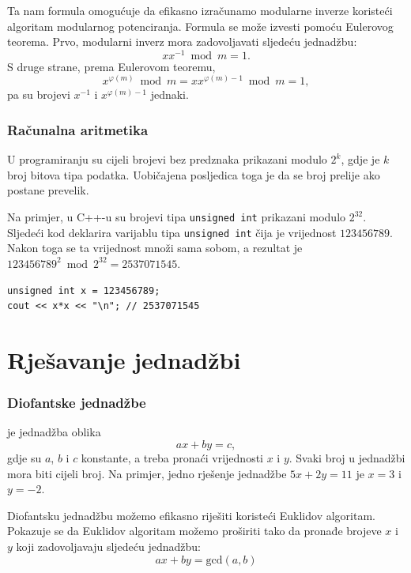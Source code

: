 Ta nam formula omogućuje da efikasno izračunamo
modularne inverze koristeći algoritam modularnog potenciranja.
Formula se može izvesti pomoću Eulerovog teorema.
Prvo, modularni inverz mora zadovoljavati sljedeću jednadžbu:
\[
x x^{-1} \bmod m = 1.
\]
S druge strane, prema Eulerovom teoremu,
\[
x^{\varphi(m)} \bmod m =  xx^{\varphi(m)-1} \bmod m = 1,
\]
pa su brojevi $x^{-1}$ i $x^{\varphi(m)-1}$ jednaki.

\subsubsection{Računalna aritmetika}

U programiranju su cijeli brojevi bez predznaka prikazani modulo $2^k$,
gdje je $k$ broj bitova tipa podatka.
Uobičajena posljedica toga je da se broj prelije
ako postane prevelik.

Na primjer, u C++-u su brojevi tipa \texttt{unsigned int}
prikazani modulo $2^{32}$.
Sljedeći kod deklarira varijablu tipa
\texttt{unsigned int} čija je vrijednost $123456789$.
Nakon toga se ta vrijednost množi sama sobom,
a rezultat je
$123456789^2 \bmod 2^{32} = 2537071545$.

\begin{lstlisting}
unsigned int x = 123456789;
cout << x*x << "\n"; // 2537071545
\end{lstlisting}

\section{Rješavanje jednadžbi}

\subsubsection*{Diofantske jednadžbe}


je jednadžba oblika
\[ ax + by = c, \]
gdje su $a$, $b$ i $c$ konstante,
a treba pronaći vrijednosti $x$ i $y$.
Svaki broj u jednadžbi mora biti cijeli broj.
Na primjer, jedno rješenje jednadžbe
$5x+2y=11$ je $x=3$ i $y=-2$.


Diofantsku jednadžbu možemo efikasno riješiti
koristeći Euklidov algoritam.
Pokazuje se da Euklidov algoritam možemo proširiti
tako da pronađe brojeve $x$ i $y$
koji zadovoljavaju sljedeću jednadžbu:
\[
ax + by = \textrm{gcd}(a,b)
\]

